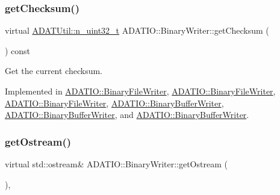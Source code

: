 \mbox{\label{classADATIO_1_1BinaryWriter_a8bebb70a7248b14c8a4dcf7aa49c1503}} 
\subsubsection{\texorpdfstring{getChecksum()}{getChecksum()}\hspace{0.1cm}{\footnotesize\ttfamily [3/3]}}
{\footnotesize\ttfamily virtual \mbox{\hyperlink{namespaceADATUtil_ad945a8afa4db2d1f89b731964adae97e}{A\+D\+A\+T\+Util\+::n\+\_\+uint32\+\_\+t}} A\+D\+A\+T\+I\+O\+::\+Binary\+Writer\+::get\+Checksum (\begin{DoxyParamCaption}{ }\end{DoxyParamCaption}) const\hspace{0.3cm}{\ttfamily [pure virtual]}}



Get the current checksum. 



Implemented in \mbox{\hyperlink{classADATIO_1_1BinaryFileWriter_ad6f9d995a02d4b3e8e12ad18972d58a5}{A\+D\+A\+T\+I\+O\+::\+Binary\+File\+Writer}}, \mbox{\hyperlink{classADATIO_1_1BinaryFileWriter_ad6f9d995a02d4b3e8e12ad18972d58a5}{A\+D\+A\+T\+I\+O\+::\+Binary\+File\+Writer}}, \mbox{\hyperlink{classADATIO_1_1BinaryFileWriter_ad6f9d995a02d4b3e8e12ad18972d58a5}{A\+D\+A\+T\+I\+O\+::\+Binary\+File\+Writer}}, \mbox{\hyperlink{classADATIO_1_1BinaryBufferWriter_a3d7ec1583f03981f0a84571646be46f3}{A\+D\+A\+T\+I\+O\+::\+Binary\+Buffer\+Writer}}, \mbox{\hyperlink{classADATIO_1_1BinaryBufferWriter_a3d7ec1583f03981f0a84571646be46f3}{A\+D\+A\+T\+I\+O\+::\+Binary\+Buffer\+Writer}}, and \mbox{\hyperlink{classADATIO_1_1BinaryBufferWriter_a3d7ec1583f03981f0a84571646be46f3}{A\+D\+A\+T\+I\+O\+::\+Binary\+Buffer\+Writer}}.

\mbox{\label{classADATIO_1_1BinaryWriter_a4fe227341d17d012bb83a070c208dac0}} 
\subsubsection{\texorpdfstring{getOstream()}{getOstream()}\hspace{0.1cm}{\footnotesize\ttfamily [1/3]}}
{\footnotesize\ttfamily virtual std\+::ostream\& A\+D\+A\+T\+I\+O\+::\+Binary\+Writer\+::get\+Ostream (\begin{DoxyParamCaption}{ }\end{DoxyParamCaption})\hspace{0.3cm}{\ttfamily [protected]}, {}}



